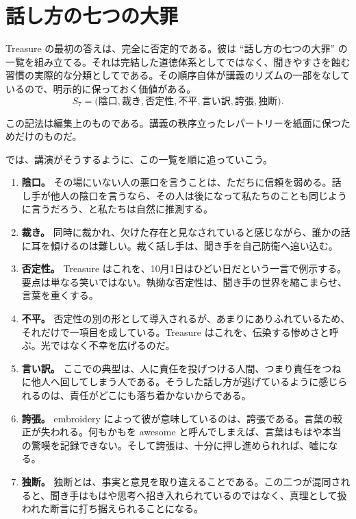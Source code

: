 \section{話し方の七つの大罪}

Treasure の最初の答えは、完全に否定的である。彼は ``話し方の七つの大罪'' の一覧を組み立てる。それは完結した道徳体系としてではなく、聞きやすさを蝕む習慣の実際的な分類としてである。その順序自体が講義のリズムの一部をなしているので、明示的に保っておく価値がある。
\begin{equation}
S_7=
\bigl(
\text{陰口},
\text{裁き},
\text{否定性},
\text{不平},
\text{言い訳},
\text{誇張},
\text{独断}
\bigr).
\end{equation}

\begin{remark}
この記法は編集上のものである。講義の秩序立ったレパートリーを紙面に保つためだけのものだ。
\end{remark}

では、講演がそうするように、この一覧を順に追っていこう。

\begin{enumerate}
\item \textbf{陰口。} その場にいない人の悪口を言うことは、ただちに信頼を弱める。話し手が他人の陰口を言うなら、その人は後になって私たちのことも同じように言うだろう、と私たちは自然に推測する。
\item \textbf{裁き。} 同時に裁かれ、欠けた存在と見なされていると感じながら、誰かの話に耳を傾けるのは難しい。裁く話し手は、聞き手を自己防衛へ追い込む。
\item \textbf{否定性。} Treasure はこれを、10月1日はひどい日だという一言で例示する。要点は単なる笑いではない。執拗な否定性は、聞き手の世界を縮こまらせ、言葉を重くする。
\item \textbf{不平。} 否定性の別の形として導入されるが、あまりにありふれているため、それだけで一項目を成している。Treasure はこれを、伝染する惨めさと呼ぶ。光ではなく不幸を広げるのだ。
\item \textbf{言い訳。} ここでの典型は、人に責任を投げつける人間、つまり責任をつねに他人へ回してしまう人である。そうした話し方が逃げているように感じられるのは、責任がどこにも落ち着かないからである。
\item \textbf{誇張。} embroidery によって彼が意味しているのは、誇張である。言葉の較正が失われる。何もかもを awesome と呼んでしまえば、言葉はもはや本当の驚嘆を記録できない。そして誇張は、十分に押し進められれば、嘘になる。
\item \textbf{独断。} 独断とは、事実と意見を取り違えることである。この二つが混同されると、聞き手はもはや思考へ招き入れられているのではなく、真理として扱われた断言に打ち据えられることになる。
\end{enumerate}

